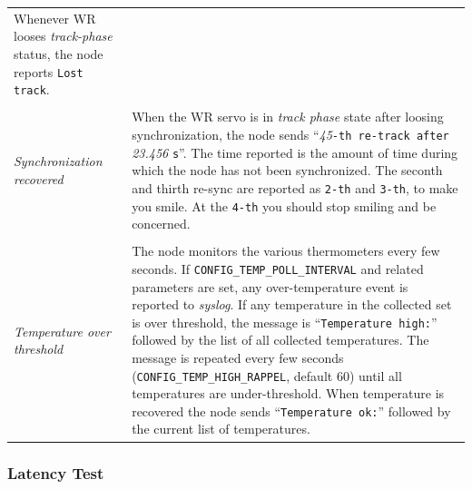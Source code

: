 \documentclass[a4paper, 12pt]{article}
\begin{document}
\begin{sloppypar}
\begin{longtable}{  p{6.5cm}  p{9cm} }
	Whenever WR looses \textit{track-phase} status, the node reports
        \texttt{Lost track}.\\
& \\
\textit{ Synchronization recovered } &

	When the WR servo is in \textit{track phase} state after loosing
        synchronization, the node sends ``\textit{45}\texttt{-th re-track after}
        \textit{23.456} \texttt{s}''. The time reported is the amount of time
        during which the node has not been synchronized. The seconth and
        thirth re-sync are reported as \texttt{2-th} and \texttt{3-th}, to make you
        smile. At the \texttt{4-th} you should stop smiling and be concerned.\\
& \\
\textit{ Temperature over threshold } &

	The node monitors the various thermometers every few seconds.
        If \texttt{CONFIG\_TEMP\_POLL\_INTERVAL} and related parameters are
        set, any over-temperature event is reported to \textit{syslog}.
        If any temperature in the collected set is over threshold,
        the message is ``\texttt{Temperature high:}'' followed by the list of
        all collected temperatures.  The message is repeated every
        few seconds (\texttt{CONFIG\_TEMP\_HIGH\_RAPPEL}, default 60)
        until all temperatures are under-threshold. When temperature
        is recovered the node sends ``\texttt{Temperature ok:}'' followed by
        the current list of temperatures.\\

\end{longtable}
\end{sloppypar}


\subsubsection{Latency Test}
\label{Latency Test}
\end{document}
